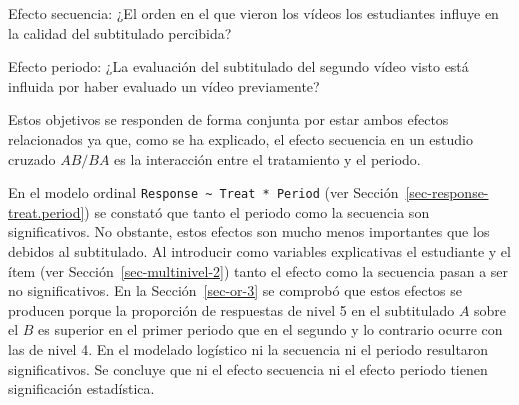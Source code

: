 \documentclass[
  12pt,
  a4paper,
  extrafontsizes,
  onecolumn,
  openright,
  table]{memoir}
\begin{document}
\begin{tcolorbox}[enhanced jigsaw, rightrule=.15mm, colback=white, toptitle=1mm, colbacktitle=quarto-callout-tip-color!10!white, toprule=.15mm, titlerule=0mm, bottomtitle=1mm, opacitybacktitle=0.6, colframe=quarto-callout-tip-color-frame, coltitle=black, leftrule=.75mm, bottomrule=.15mm, title=\textcolor{quarto-callout-tip-color}{\faLightbulb}\hspace{0.5em}{Objetivo específico}, arc=.35mm, breakable, opacityback=0, left=2mm]

Efecto secuencia: ¿El orden en el que vieron los vídeos los estudiantes
influye en la calidad del subtitulado percibida?

\end{tcolorbox}

\begin{tcolorbox}[enhanced jigsaw, rightrule=.15mm, colback=white, toptitle=1mm, colbacktitle=quarto-callout-tip-color!10!white, toprule=.15mm, titlerule=0mm, bottomtitle=1mm, opacitybacktitle=0.6, colframe=quarto-callout-tip-color-frame, coltitle=black, leftrule=.75mm, bottomrule=.15mm, title=\textcolor{quarto-callout-tip-color}{\faLightbulb}\hspace{0.5em}{Objetivo específico}, arc=.35mm, breakable, opacityback=0, left=2mm]

Efecto periodo: ¿La evaluación del subtitulado del segundo vídeo visto
está influida por haber evaluado un vídeo previamente?

\end{tcolorbox}

Estos objetivos se responden de forma conjunta por estar ambos efectos
relacionados ya que, como se ha explicado, el efecto secuencia en un
estudio cruzado \(AB/BA\) es la interacción entre el tratamiento y el
periodo.

En el modelo ordinal
\texttt{Response\ \textasciitilde{}\ Treat\ *\ Period} (ver
Sección~\ref{sec-response-treat.period}) se constató que tanto el
periodo como la secuencia son significativos. No obstante, estos efectos
son mucho menos importantes que los debidos al subtitulado. Al
introducir como variables explicativas el estudiante y el ítem (ver
Sección~\ref{sec-multinivel-2}) tanto el efecto como la secuencia pasan
a ser no significativos. En la Sección~\ref{sec-or-3} se comprobó que
estos efectos se producen porque la proporción de respuestas de nivel 5
en el subtitulado \(A\) sobre el \(B\) es superior en el primer periodo
que en el segundo y lo contrario ocurre con las de nivel 4. En el
modelado logístico ni la secuencia ni el periodo resultaron
significativos. Se concluye que ni el efecto secuencia ni el efecto
periodo tienen significación estadística.
\end{document}
